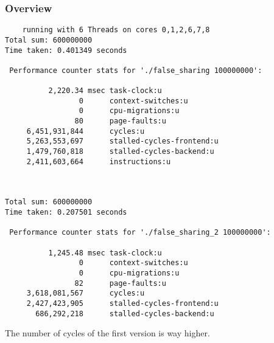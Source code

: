 \documentclass[parskip]{scrartcl}
\begin{document}
	\subsubsection{Overview}
	\begin{verbatim}
	running with 6 Threads on cores 0,1,2,6,7,8
Total sum: 600000000
Time taken: 0.401349 seconds

 Performance counter stats for './false_sharing 100000000':

          2,220.34 msec task-clock:u        
                 0      context-switches:u                   
                 0      cpu-migrations:u                
                80      page-faults:u              
     6,451,931,844      cycles:u
     5,263,553,697      stalled-cycles-frontend:u
     1,479,760,818      stalled-cycles-backend:u
     2,411,603,664      instructions:u           



Total sum: 600000000
Time taken: 0.207501 seconds

 Performance counter stats for './false_sharing_2 100000000':

          1,245.48 msec task-clock:u               
                 0      context-switches:u                    
                 0      cpu-migrations:u                    
                82      page-faults:u                
     3,618,081,567      cycles:u                  
     2,427,423,905      stalled-cycles-frontend:u 
       686,292,218      stalled-cycles-backend:u 
	\end{verbatim}
	
	The number of cycles of the first version is way higher.
\end{document}
